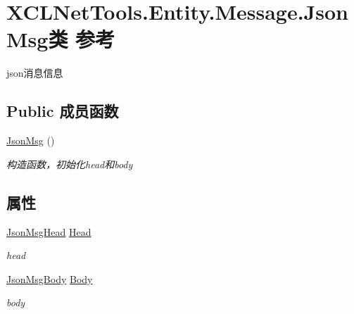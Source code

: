 \hypertarget{class_x_c_l_net_tools_1_1_entity_1_1_message_1_1_json_msg}{\section{X\-C\-L\-Net\-Tools.\-Entity.\-Message.\-Json\-Msg类 参考}
\label{class_x_c_l_net_tools_1_1_entity_1_1_message_1_1_json_msg}
}


json消息信息  


\subsection*{Public 成员函数}
\begin{DoxyCompactItemize}
\item 
\hyperlink{class_x_c_l_net_tools_1_1_entity_1_1_message_1_1_json_msg_ae2ac35179c067375a48b581b155a8763}{Json\-Msg} ()
\begin{DoxyCompactList}\small\item\em 构造函数，初始化head和body \end{DoxyCompactList}\end{DoxyCompactItemize}
\subsection*{属性}
\begin{DoxyCompactItemize}
\item 
\hyperlink{class_x_c_l_net_tools_1_1_entity_1_1_message_1_1_json_msg_head}{Json\-Msg\-Head} \hyperlink{class_x_c_l_net_tools_1_1_entity_1_1_message_1_1_json_msg_a563af2b66f8c22c04ff557cfe34f2479}{Head}
\begin{DoxyCompactList}\small\item\em head \end{DoxyCompactList}\item 
\hyperlink{class_x_c_l_net_tools_1_1_entity_1_1_message_1_1_json_msg_body}{Json\-Msg\-Body} \hyperlink{class_x_c_l_net_tools_1_1_entity_1_1_message_1_1_json_msg_acf586e3003ee68f1b03a77a75b519ad3}{Body}
\begin{DoxyCompactList}\small\item\em body \end{DoxyCompactList}\end{DoxyCompactItemize}


